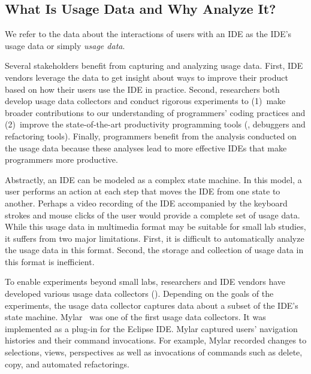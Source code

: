 

\subsection{What Is Usage Data and Why Analyze It?}

We refer to the data about the interactions of users with an IDE as the IDE's
usage data or simply \emph{usage data}.

%
Several stakeholders benefit from capturing and analyzing usage data. First, IDE
vendors leverage the data to get insight about ways to improve their product
based on how their users use the IDE in practice. Second, researchers both
develop usage data collectors and conduct rigorous experiments to (1)~make
broader contributions to our understanding of programmers' coding practices and
(2)~improve the state-of-the-art productivity programming tools (\eg, debuggers
and refactoring tools). Finally, programmers benefit from the analysis conducted
on the usage data because these analyses lead to more effective IDEs that make
programmers more productive.

Abstractly, an IDE can be modeled as a complex state machine. In this model, a
user performs an action at each step that moves the IDE from one state to
another.
%
Perhaps a video recording of the IDE accompanied by the keyboard strokes and
mouse clicks of the user would provide a complete set of usage data.
%
While this usage data in multimedia format may be suitable for small lab
studies, it suffers from two major limitations. First, it is difficult to
automatically analyze the usage data in this format. Second, the storage and
collection of usage data in this format is inefficient.

To enable experiments beyond small labs, researchers and IDE vendors have
developed various usage data collectors ().
Depending on the goals of the experiments, the usage data collector captures
data about a subset of the IDE's state machine.
%
Mylar~\cite{V:Murphy2006How} was one of the first usage data collectors. It was
implemented as a plug-in for the Eclipse IDE. Mylar captured users' navigation
histories and their command invocations. For example, Mylar recorded changes to
selections, views, perspectives as well as invocations of commands such as
delete, copy, and automated refactorings.


